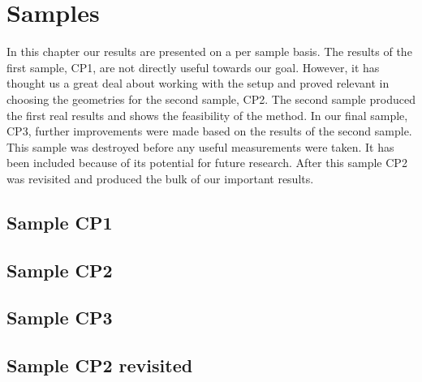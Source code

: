 \chapter{Samples}
\label{chapter:samples}
In this chapter our results are presented on a per sample basis. The results of the first sample, CP1, are not directly useful towards our goal. However, it has thought us a great deal about working with the setup and proved relevant in choosing the geometries for the second sample, CP2. The second sample produced the first real results and shows the feasibility of the method. In our final sample, CP3, further improvements were made based on the results of the second sample. This sample was destroyed before any useful measurements were taken. It has been included because of its potential for future research. After this sample CP2 was revisited and produced the bulk of our important results.

\section{Sample CP1}


\newpage
\section{Sample CP2}


\newpage
\section{Sample CP3}


\newpage
\section{Sample CP2 revisited}
